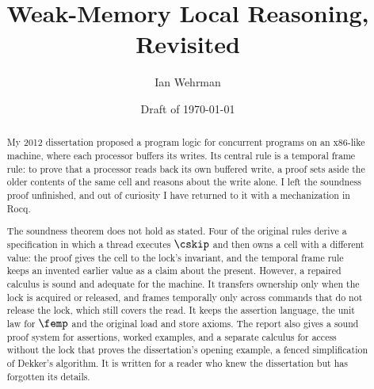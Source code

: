 \documentclass[11pt]{article}
\title{Weak-Memory Local Reasoning, Revisited}
\author{Ian Wehrman}
\date{Draft of \today}
\begin{document}
\maketitle

\begin{abstract}
My 2012 dissertation proposed a program logic for concurrent programs on an
x86-like machine, where each processor buffers its writes. Its central rule
is a temporal frame rule: to prove that a processor reads back its own
buffered write, a proof sets aside the older contents of the same cell and
reasons about the write alone. I left the soundness proof unfinished, and
out of curiosity I have returned to it with a mechanization in Rocq.

The soundness theorem does not hold as stated. Four of the original rules
derive a specification in which a thread executes $\cskip$ and then owns a
cell with a different value: the proof gives the cell to the lock's
invariant, and the temporal frame rule keeps an invented earlier value as a
claim about the present. However, a repaired calculus is sound and adequate
for the machine. It transfers ownership only when the lock is acquired or
released, and frames temporally only across commands that do not release
the lock, which still covers the read. It keeps the assertion language,
the unit law for $\femp$ and the original load and store axioms. The report
also gives a sound proof system for assertions, worked examples, and a
separate calculus for access without the lock that proves the
dissertation's opening example, a fenced simplification of Dekker's
algorithm. It is written for a reader who knew the dissertation but has
forgotten its details.
\end{abstract}













\end{document}
